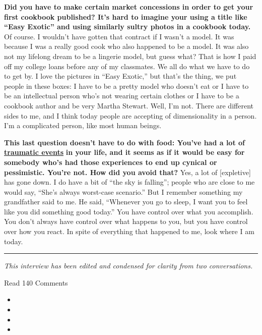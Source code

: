 \textbf{Did you have to make certain market concessions in order to get
your first cookbook published? It's hard to imagine your using a title
like ``Easy Exotic'' and using similarly sultry photos in a cookbook
today.} Of course. I wouldn't have gotten that contract if I wasn't a
model. It was because I was a really good cook who also happened to be a
model. It was also not my lifelong dream to be a lingerie model, but
guess what? That is how I paid off my college loans before any of my
classmates. We all do what we have to do to get by. I love the pictures
in ``Easy Exotic,'' but that's the thing, we put people in these boxes:
I have to be a pretty model who doesn't eat or I have to be an
intellectual person who's not wearing certain clothes or I have to be a
cookbook author and be very Martha Stewart. Well, I'm not. There are
different sides to me, and I think today people are accepting of
dimensionality in a person. I'm a complicated person, like most human
beings.

\textbf{This last question doesn't have to do with food: You've had a
lot of}
\textbf{\href{http://nytimes3xbfgragh.onion\#tooltip-12}{traumatic
events}} \textbf{in your life, and it seems as if it would be easy for
somebody who's had those experiences to end up cynical or pessimistic.
You're not. How did you avoid that?} Yes, a lot of {[}expletive{]} has
gone down. I do have a bit of ``the sky is falling''; people who are
close to me would say, ``She's always worst-case scenario.'' But I
remember something my grandfather said to me. He said, ``Whenever you go
to sleep, I want you to feel like you did something good today.'' You
have control over what you accomplish. You don't always have control
over what happens to you, but you have control over how you react. In
spite of everything that happened to me, look where I am today.

\begin{center}\rule{0.5\linewidth}{\linethickness}\end{center}

\emph{This interview has been edited and condensed for clarity from two
conversations.}

Read 140 Comments

\begin{itemize}
\item
\item
\item
\item
\end{itemize}

